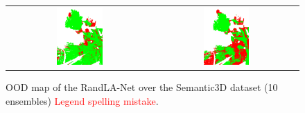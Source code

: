 \begin{figure}[h!]
\begin{tabular}{cc}
            \includegraphics[width=0.33\textwidth, height=0.18\textheight]{images/ood_imgs/sem3d_of/prob/de_sem3d_OOD_3.pdf}&
            \includegraphics[width=0.33\textwidth, height=0.18\textheight]{images/ood_imgs/sem3d_of/prob/de_sem3d_of_OOD_3.pdf}\\
        \end{tabular}
        \caption{OOD map of the RandLA-Net over the Semantic3D dataset (10 ensembles) \textcolor{red}{Legend spelling mistake}.}
        \label{fig:de_oodmap_sem3d_OF_prob}
    \end{figure}

